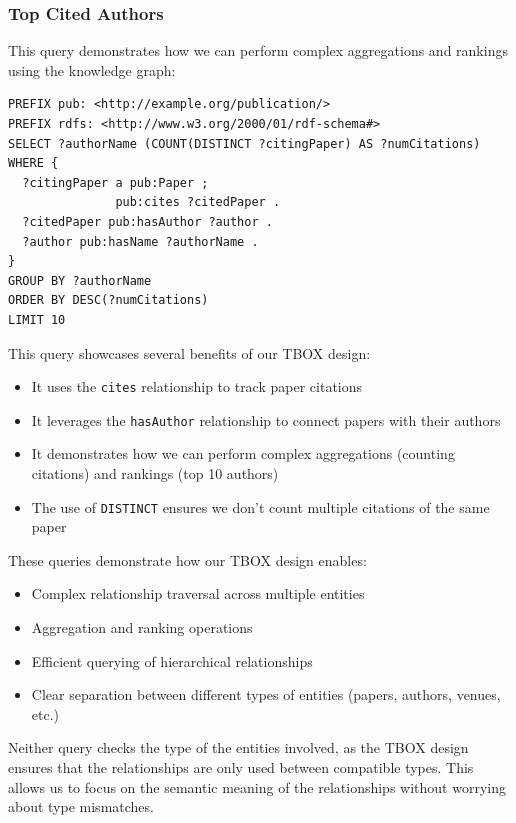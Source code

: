 \documentclass[10pt,a4paper]{article}
\begin{document}
\subsubsection{Top Cited Authors}
This query demonstrates how we can perform complex aggregations and rankings using the knowledge graph:

\begin{verbatim}
PREFIX pub: <http://example.org/publication/>
PREFIX rdfs: <http://www.w3.org/2000/01/rdf-schema#>
SELECT ?authorName (COUNT(DISTINCT ?citingPaper) AS ?numCitations)
WHERE {
  ?citingPaper a pub:Paper ;
               pub:cites ?citedPaper .
  ?citedPaper pub:hasAuthor ?author .
  ?author pub:hasName ?authorName .
}
GROUP BY ?authorName
ORDER BY DESC(?numCitations)
LIMIT 10
\end{verbatim}

This query showcases several benefits of our TBOX design:
\begin{itemize}
    \item It uses the \texttt{cites} relationship to track paper citations
    \item It leverages the \texttt{hasAuthor} relationship to connect papers with their authors
    \item It demonstrates how we can perform complex aggregations (counting citations) and rankings (top 10 authors)
    \item The use of \texttt{DISTINCT} ensures we don't count multiple citations of the same paper
\end{itemize}

\vspace{1em}
\noindent
These queries demonstrate how our TBOX design enables:
\begin{itemize}
    \item Complex relationship traversal across multiple entities
    \item Aggregation and ranking operations
    \item Efficient querying of hierarchical relationships
    \item Clear separation between different types of entities (papers, authors, venues, etc.)
\end{itemize}
\vspace{1em}
Neither query checks the type of the entities involved, as the TBOX design ensures that the relationships are only used between compatible types. This allows us to focus on the semantic meaning of the relationships without worrying about type mismatches. 
\end{document}
